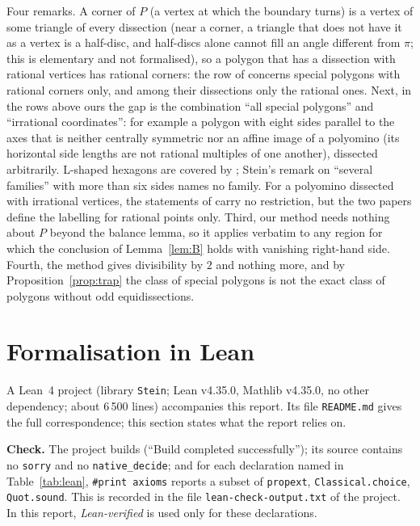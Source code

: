 \documentclass[11pt]{article}
\theoremstyle{definition}
\newcommand{\tL}[1]{\texttt{#1}}
\begin{document}
Four remarks. A corner of $P$ (a vertex at which the boundary turns) is a vertex of some
triangle of every dissection (near a corner, a triangle that does not have it as a vertex is a
half-disc, and half-discs alone cannot fill an angle different from $\pi$; this is elementary and
not formalised), so a polygon that has a dissection with rational vertices has rational
corners: the row of \cite{Rud} concerns special polygons with rational corners only, and among
their dissections only the rational ones. Next, in the rows above ours the gap is the combination ``all special polygons'' and
``irrational coordinates'': for example a polygon with eight sides parallel to the axes that is
neither centrally symmetric nor an affine image of a polyomino (its horizontal side lengths are
not rational multiples of one another), dissected arbitrarily. L-shaped hexagons are covered by
\cite[Theorem 1]{Ste00}; Stein's remark on ``several families'' with more than six sides
\cite[p.~145]{Ste00} names no family. For a polyomino dissected with irrational vertices, the
statements of \cite{Ste99,Pra} carry no restriction, but the two papers define the labelling for
rational points only.
Third, our method needs nothing about $P$ beyond the balance lemma, so it applies verbatim to any
region for which the conclusion of Lemma~\ref{lem:B} holds with vanishing right-hand side. Fourth,
the method gives divisibility by $2$ and nothing more, and by Proposition~\ref{prop:trap} the class
of special polygons is not the exact class of polygons without odd equidissections.

\section{Formalisation in Lean}\label{sec:lean}

A Lean~4 project (library \tL{Stein}; Lean v4.35.0, Mathlib v4.35.0, no other dependency;
about 6\,500 lines) accompanies this report. Its file \tL{README.md} gives the full correspondence;
this section states what the report relies on.

\textbf{Check.} The project builds (``Build completed successfully''); its source contains no
\tL{sorry} and no \tL{native\_decide}; and for each declaration named in Table~\ref{tab:lean},
\tL{\#print axioms} reports a subset of \tL{propext}, \tL{Classical.choice}, \tL{Quot.sound}. This
is recorded in the file \tL{lean-check-output.txt} of the project. In
this report, \emph{Lean-verified} is used only for these declarations.
\end{document}
